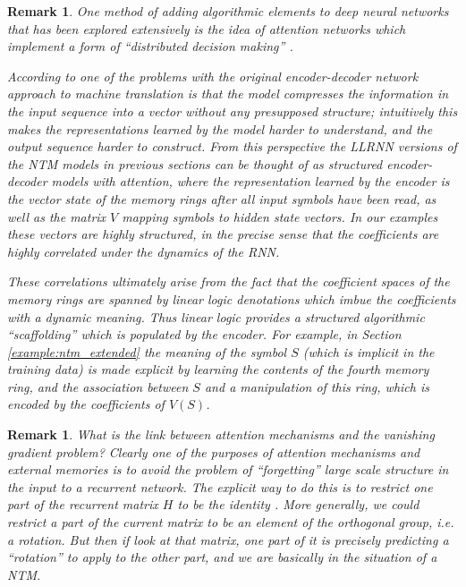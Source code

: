 \documentclass[english,letter paper,12pt,leqno]{article}
\theoremstyle{example}
\newtheorem{remark}[theorem]{Remark}
\numberwithin{equation}{section}
\begin{document}
\begin{remark} One method of adding algorithmic elements to deep neural networks that has been explored extensively is the idea of \emph{attention networks} which implement a form of ``distributed decision making'' \cite[p.1]{cho}.

According to \cite[\S III.A]{cho} one of the problems with the original encoder-decoder network approach to machine translation \cite{sutskever2} is that the model compresses the information in the input sequence into a vector without any presupposed structure; intuitively this makes the representations learned by the model harder to understand, and the output sequence harder to construct. From this perspective the LLRNN versions of the NTM models in previous sections can be thought of as structured encoder-decoder models with attention, where the representation learned by the encoder is the vector state of the memory rings after all input symbols have been read, as well as the matrix $V$ mapping symbols to hidden state vectors. In our examples these vectors are highly structured, in the precise sense that the coefficients are highly correlated under the dynamics of the RNN.

These correlations ultimately arise from the fact that the coefficient spaces of the memory rings are spanned by linear logic denotations which imbue the coefficients with a dynamic meaning. Thus linear logic provides a structured algorithmic ``scaffolding'' which is populated by the encoder. For example, in Section \ref{example:ntm_extended} the meaning of the symbol $S$ (which is implicit in the training data) is made explicit by learning the contents of the fourth memory ring, and the association between $S$ and a manipulation of this ring, which is encoded by the coefficients of $V(S)$.
\end{remark}

\begin{remark} What is the link between attention mechanisms and the vanishing gradient problem? Clearly one of the purposes of attention mechanisms and external memories is to avoid the problem of ``forgetting'' large scale structure in the input to a recurrent network. The explicit way to do this is to restrict one part of the recurrent matrix $H$ to be the identity \cite{mikolovmemory}. More generally, we could restrict a part of the current matrix to be an element of the orthogonal group, i.e. a rotation. But then if look at that matrix, one part of it is precisely predicting a ``rotation'' to apply to the other part, and we are basically in the situation of a NTM.
\end{remark}
\end{document}

